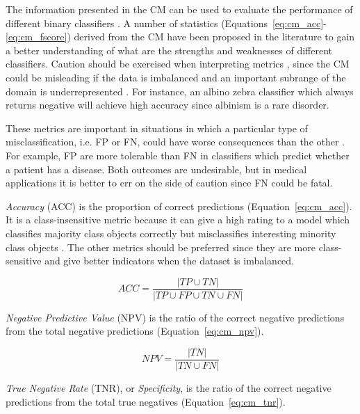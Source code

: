 The information presented in the CM can be used to evaluate the performance of different binary classifiers \citep{lu2004predicting}. A number of statistics (Equations~\ref{eq:cm_acc}-\ref{eq:cm_fscore}) derived from the CM have been proposed in the literature \citep{deng2016improved} to gain a better understanding of what are the strengths and weaknesses of different classifiers. Caution should be exercised when interpreting metrics \citep{jeni2013facing}, since the CM could be misleading if the data is imbalanced and an important subrange of the domain is underrepresented \citep{raeder2012learning}. For instance, an albino zebra classifier which always returns negative will achieve high accuracy since albinism is a rare disorder.

These metrics are important in situations in which a particular type of misclassification, i.e. FP or FN, could have worse consequences than the other \citep{hassanien2017advances}. For example, FP are more tolerable than FN in classifiers which predict whether a patient has a disease. Both outcomes are undesirable, but in medical applications it is better to err on the side of caution since FN could be fatal.

\textit{Accuracy} (ACC) is the proportion of correct predictions (Equation~\ref{eq:cm_acc}). It is a class-insensitive metric because it can give a high rating to a model which classifies majority class objects correctly but misclassifies interesting minority class objects \citep{branco2016survey}. The other metrics should be preferred since they are more class-sensitive and give better indicators when the dataset is imbalanced.

\begin{equation}
\label{eq:cm_acc}
ACC = \frac{|TP \cup TN|}{|TP \cup FP \cup TN \cup FN|}
\end{equation}

\textit{Negative Predictive Value} (NPV) is the ratio of the correct negative predictions from the total negative predictions (Equation~\ref{eq:cm_npv}).

\begin{equation}
\label{eq:cm_npv}
NPV = \frac{|TN|}{|TN \cup FN|}
\end{equation}

\textit{True Negative Rate} (TNR), or \textit{Specificity}, is the ratio of the correct negative predictions from the total true negatives (Equation~\ref{eq:cm_tnr}).

